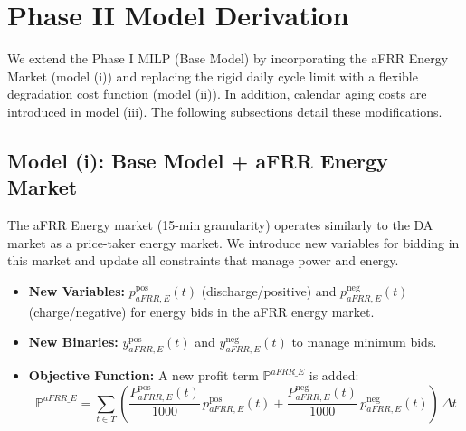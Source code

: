 \documentclass[11pt, a4paper]{article}
\begin{document}
\section{Phase II Model Derivation}
We extend the Phase I MILP (Base Model) by incorporating the aFRR Energy Market (model (i)) and replacing the rigid daily cycle limit with a flexible degradation cost function (model (ii)). In addition, calendar aging costs are introduced in model (iii). The following subsections detail these modifications.

\subsection{Model (i): Base Model + aFRR Energy Market}
The aFRR Energy market (15-min granularity) operates similarly to the DA market as a price-taker energy market. We introduce new variables for bidding in this market and update all constraints that manage power and energy.

\begin{itemize}
    \item \textbf{New Variables:} $p^{\mathrm{pos}}_{aFRR,E}(t)$ (discharge/positive) and $p^{\mathrm{neg}}_{aFRR,E}(t)$ (charge/negative) for energy bids in the aFRR energy market.
    \item \textbf{New Binaries:} $y^{\mathrm{pos}}_{aFRR,E}(t)$ and $y^{\mathrm{neg}}_{aFRR,E}(t)$ to manage minimum bids.
    \item \textbf{Objective Function:} A new profit term $\mathbb{P}^{aFRR\_E}$ is added:
    \begin{equation}
    \mathbb{P}^{aFRR\_E} = \sum_{t\in T} \left( \frac{P^{\mathrm{pos}}_{aFRR, E}(t)}{1000}\, p^{\mathrm{pos}}_{aFRR, E}(t) + \frac{P^{\mathrm{neg}}_{aFRR, E}(t)}{1000}\, p^{\mathrm{neg}}_{aFRR, E}(t) \right)\, \Delta t   
    \end{equation}

\end{itemize}
\end{document}
